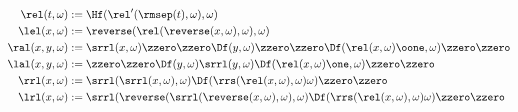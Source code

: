 \begin{conditional}{\notappendix}
\begin{defn}
      \begin{align*}
        \rel(t,\omega) &:= \Hf(\rel'(\rmsep(t),\omega),\omega)\\
        \lel(x, \omega) &:= \reverse(\rel(\reverse(x, \omega), \omega), \omega)\\
        \ral(x, y, \omega) &:= \srrl(x, \omega)\zzero \zzero
                               \Df(y, \omega)\zzero \zzero
                               \Df(\rel(x,\omega)\oone, \omega)\zzero\zzero
                                \\%
        \lal(x, y, \omega) &:= \zzero \zzero\Df(y, \omega)
                                \srrl(y, \omega)
                                \Df(\rel(x, \omega)\one, \omega)
                                \zzero\zzero\\%
        \rrl(x,\omega) &:=  \srrl(\srrl(x, \omega), \omega)
                            \Df(\rrs(\rel(x, \omega),\omega) \omega)
                            \zzero\zzero \\
        \lrl(x,\omega) &:=  \srrl(\reverse(\srrl(\reverse(x, \omega), \omega),\omega)
                            \Df(\rrs(\rel(x, \omega),\omega) \omega)
                            \zzero\zzero \\
      \end{align*}
    \end{defn}


\end{conditional}

